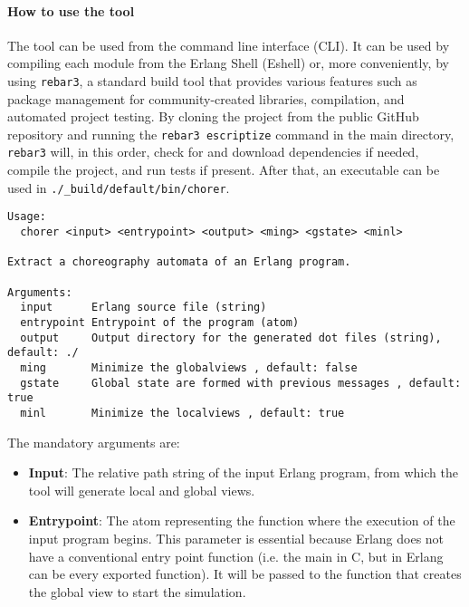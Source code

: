 \paragraph{How to use the tool}
The tool can be used from the command line interface (CLI). It can be used by
compiling each module from the Erlang Shell (Eshell) or, more conveniently, by
using \texttt{rebar3}, a standard build tool that provides various features
such as package management for community-created libraries, compilation, and
automated project testing. By cloning the project from the public GitHub
repository and running the \texttt{rebar3 escriptize} command in the main
directory, \texttt{rebar3} will, in this order, check for and download
dependencies if needed, compile the project, and run tests if present. After
that, an executable can be used in \texttt{./\_build/default/bin/chorer}.

\begin{lstlisting}[caption=Usage message]
Usage:
  chorer <input> <entrypoint> <output> <ming> <gstate> <minl>

Extract a choreography automata of an Erlang program.

Arguments:
  input      Erlang source file (string)
  entrypoint Entrypoint of the program (atom)
  output     Output directory for the generated dot files (string), default: ./
  ming       Minimize the globalviews , default: false
  gstate     Global state are formed with previous messages , default: true
  minl       Minimize the localviews , default: true
\end{lstlisting}

\noindent The mandatory arguments are:
\begin{itemize}
    \item \textbf{Input}: The relative path string of the input Erlang program,
    from which the tool will generate local and global views.
    \item \textbf{Entrypoint}: The atom representing the function where the
    execution of the input program begins. This parameter is essential because
    Erlang does not have a conventional entry point function (i.e. the main in C,
    but in Erlang can be every exported function). It will be passed to the
    function that creates the global view to start the simulation.
\end{itemize}

